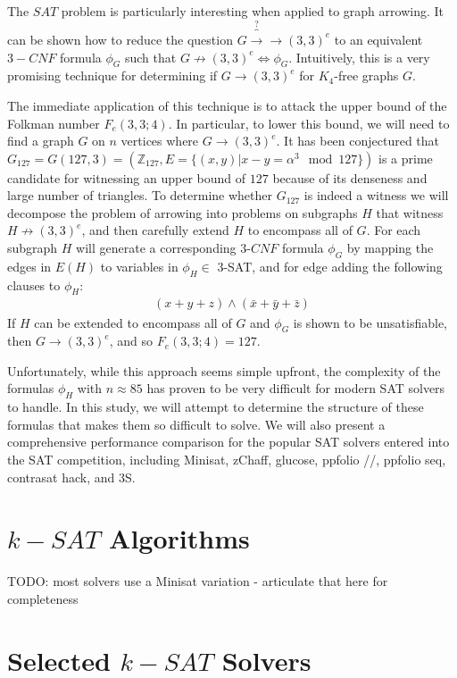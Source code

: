 \documentclass[paper=a4, fontsize=11pt]{scrartcl} %
\begin{document}
The $SAT$ problem is particularly interesting when applied to graph arrowing. It can be shown
how to reduce the question $G \overbrace{\to}^\text{?} \to (3,3)^e$ to an equivalent $3-CNF$ formula
$\phi_G$ such that $G \not \to (3,3)^e \Leftrightarrow \phi_G$. Intuitively, this is a very promising
technique for determining if $G \to (3,3)^e$ for $K_4$-free graphs $G$.

The immediate application of this technique is to attack the upper bound of the Folkman number
$F_e(3,3;4)$. In particular, to lower this bound, we will need to find a 
graph $G$ on $n$ vertices where $G \to (3,3)^e$. It has been conjectured that 
$G_{127} = G(127,3) = (\mathbb{Z}_{127}, E = \{(x,y) | x - y = \alpha^3 \mod 127\})$ is a
prime candidate for witnessing an upper bound of $127$ because of its denseness and large number
of triangles. To determine whether $G_{127}$ is indeed a witness we will decompose 
the problem of arrowing into problems on subgraphs $H$ that witness $H \not \to (3,3)^e$, 
and then carefully extend $H$ to encompass all of $G$. For each subgraph $H$ will generate
a corresponding $3$-$CNF$ formula $\phi_G$ by mapping the edges in $E(H)$ to variables 
in $\phi_H \in$ 3-SAT, and for edge adding the following clauses to $\phi_H$:
\begin{align*}
(x + y + z) \wedge (\bar{x} + \bar{y} + \bar{z})
\end{align*}
If $H$ can be extended to encompass all of $G$ and $\phi_G$ is 
shown to be unsatisfiable, then $G \to (3,3)^e$, and so $F_e(3,3;4) = 127$.

Unfortunately, while this approach seems simple upfront, the complexity of the formulas
$\phi_H$ with $n \approx 85$ has proven to be very difficult for modern SAT solvers
to handle. In this study, we will attempt to determine the structure of these formulas
that makes them so difficult to solve. We will also present a comprehensive performance 
comparison for the popular SAT solvers entered into the SAT competition, including
Minisat, zChaff, glucose, ppfolio //, ppfolio seq, contrasat hack, and 3S.

\section{$k-SAT$ Algorithms}
{\color{red} TODO}: most solvers use a Minisat variation - articulate that here for completeness

\section{Selected $k-SAT$ Solvers}
\end{document}
